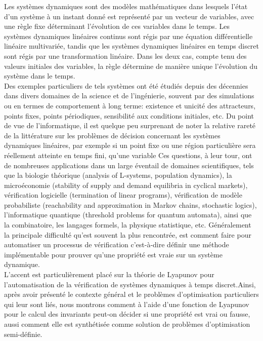 \label{sec:introduction}

\vskip 1cm
Les systèmes dynamiques sont des modèles mathématiques dans lesquels l'état d'un système à un instant donné est représenté par un vecteur de variables, avec une règle fixe déterminant l'évolution de ces variables dans le temps. Les systèmes dynamiques linéaires continus sont régis par une équation différentielle linéaire multivariée, tandis que les systèmes dynamiques linéaires en temps discret sont régis par une transformation linéaire. Dans les deux cas, compte tenu des valeurs initiales des variables, la règle détermine de manière unique l'évolution du système dans le temps.\\

Des exemples particuliers de tels systèmes ont été étudiés depuis des décennies dans divers domaines de la science et de l'ingénierie, souvent par des simulations ou en termes de comportement à long terme: existence et unicité des attracteurs, points fixes, points périodiques, sensibilité aux conditions initiales, etc. Du point de vue de l'informatique, il est quelque peu surprenant de noter la relative rareté de la littérature sur les problèmes de décision concernant les systèmes dynamiques linéaires, par exemple si un point fixe ou une région particulière sera réellement atteinte en temps fini, qu'une variable Ces questions, à leur tour, ont de nombreuses applications dans un large éventail de domaines scientifiques, tels que la biologie théorique (analysis of L-systems, population dynamics), la microéconomie (stability of supply and demand equilibria in cyclical markets), vérification logicielle (termination of linear programs), vérification de modèle probabiliste (reachability and approximation in Markov chains, stochastic logics), l'informatique quantique (threshold problems for quantum automata), ainsi que la combinatoire, les langages formels, la physique statistique, etc. Généralement la principale difficulté qu'est souvent la plus rencontrée,  est comment faire pour automatiser un processus de vérification c’est-à-dire définir une méthode implémentable pour prouver qu’une propriété est vraie sur un système dynamique. \\


L'accent est particulièrement placé sur la théorie de Lyapunov pour l'automatisation de la vérification de systèmes dynamiques \`a temps discret.Ainsi, après avoir présenté le contexte général et le problèmes d'optimisation particuliers qui leur sont liés, nous montrons comment à l'aide d'une fonction de Lyapunov pour le calcul des invariants peut-on décider si une propriété est vrai ou fausse, aussi comment elle   
est synthétisée comme solution de problèmes d'optimisation semi-définie.\\


